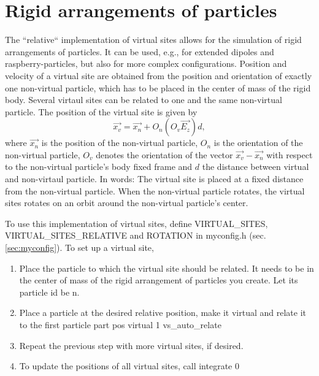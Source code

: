 \section{Rigid arrangements of particles}

The ``relative`` implementation of virtual sites allows for the simulation of rigid arrangements of particles. It can be used, e.g., for extended dipoles and raspberry-particles, but also for more complex configurations. 
Position and velocity of a virtual site are obtained from the position and orientation of exactly one non-virtual particle, which has to be placed in the center of mass of the rigid body. Several virtaul sites can be related to one and the same non-virtual particle.
The position of the virtual site is given by
\begin{equation}
\vec{x_v} =\vec{x_n} +O_n (O_v \vec{E_z}) d,
\end{equation}
where $\vec{x_n}$ is the position of the non-virtual particle, $O_n$ is the orientation of the non-virtual particle, $O_v$ denotes the orientation of the vector $\vec{x_v}-\vec{x_n}$ with respect to the non-virtual particle's body fixed frame and $d$ the distance between virtual and non-virtaul particle. 
In words: The virtual site is placed at a fixed distance from the non-virtual particle. When the non-virtual particle rotates, the virtual sites rotates on an orbit around the non-virtual particle's center.

To use this implementation of virtual sites, define VIRTUAL\_SITES, VIRTUAL\_SITES\_RELATIVE and ROTATION in myconfig.h (sec. \ref{sec:myconfig}).
To set up a virtual site,
\begin{enumerate}
\item Place the particle to which the virtual site should be related. It needs to be in the center of mass of the rigid arrangement of particles you create. Let its particle id be n.
\item Place a particle at the desired relative position, make it virtual and relate it to the first particle\newline
part  pos  virtual 1 vs\_auto\_relate 
\item Repeat the previous step with more virtual sites, if desired.
\item To update the positions of all virtual sites, call\newline
integrate 0
\end{enumerate}

